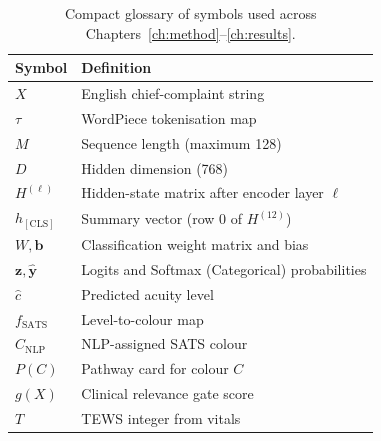 \begin{table}[H]
\centering
\small
\begin{tabular}{|l|p{10cm}|}
\hline
\textbf{Symbol} & \textbf{Definition} \\
\hline
\(X\) & English chief-complaint string \\
\(\tau\) & WordPiece tokenisation map \\
\(M\) & Sequence length (maximum 128) \\
\(D\) & Hidden dimension (768) \\
\(H^{(\ell)}\) & Hidden-state matrix after encoder layer \(\ell\) \\
\(h_{\mathrm{[CLS]}}\) & Summary vector (row 0 of \(H^{(12)}\)) \\
\(W,\mathbf{b}\) & Classification weight matrix and bias \\
\(\mathbf{z},\hat{\mathbf{y}}\) & Logits and Softmax (Categorical) probabilities \\
\(\hat{c}\) & Predicted acuity level \\
\(f_{\mathrm{SATS}}\) & Level-to-colour map \\
\(C_{\mathrm{NLP}}\) & NLP-assigned SATS colour \\
\(P(C)\) & Pathway card for colour \(C\) \\
\(g(X)\) & Clinical relevance gate score \\
\(T\) & TEWS integer from vitals \\
\hline
\end{tabular}
\caption{Compact glossary of symbols used across Chapters~\ref{ch:method}--\ref{ch:results}.}
\label{tab:glossary}
\end{table}
